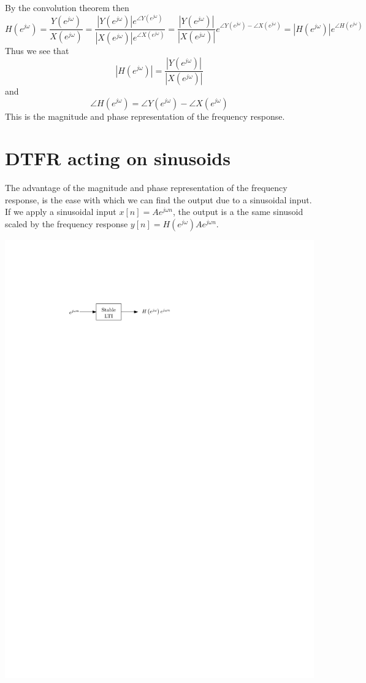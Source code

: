 By the convolution theorem then
  \[
  H\left(e^{j\omega}\right) = \frac{Y\left(e^{j\omega}\right)}{X\left(e^{j\omega}\right)} = \frac{|Y\left(e^{j\omega}\right)|e^{\angle Y\left(e^{j\omega}\right)}}{ |X\left(e^{j\omega}\right)|e^{\angle X\left(e^{j\omega}\right)}} = \frac{|Y\left(e^{j\omega}\right)|}{|X\left(e^{j\omega}\right)|}e^{\angle Y\left(e^{j\omega}\right) - \angle X\left(e^{j\omega}\right)} = |H\left(e^{j\omega}\right)|e^{\angle H\left(e^{j\omega}\right)}
  \]
  Thus we see that
  \[
  |H\left(e^{j\omega}\right)| = \frac{|Y\left(e^{j\omega}\right)|}{|X\left(e^{j\omega}\right)|}
  \]
  and
  \[
  \angle H\left(e^{j\omega}\right) = \angle Y\left(e^{j\omega}\right) - \angle X\left(e^{j\omega}\right)
  \]
  This is the magnitude and phase representation of the frequency response.
  
\section{DTFR acting on sinusoids}

The advantage of the magnitude and phase representation of the frequency response, is the ease with which we can find the output due to a sinusoidal input. If we apply a sinusoidal input $x[n] = A e^{j\omega n}$, the output is a the same sinusoid scaled by the frequency response $y[n] = H\left(e^{j\omega}\right) A e^{j\omega n}$.

\begin{center}
  \includegraphics[scale=1]{graphics/19-dt-fr.pdf}
\end{center}

